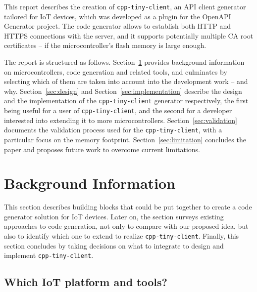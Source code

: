 \documentclass[manuscript,screen]{acmart}
\begin{document}
This report describes the creation of \texttt{cpp-tiny-client}, an API client generator tailored for IoT devices, which was developed as a plugin for the OpenAPI Generator project\cite{OpenAPIGenerator}. The code generator allows to establish both HTTP and HTTPS connections with the server, and it supports potentially multiple CA root certificates -- if the microcontroller's flash memory is large enough. 

The report is structured as follows. Section~\ref{sec:background} provides background information on microcontrollers, code generation and related tools, and culminates by selecting which of them are taken into account into the development work -- and why. Section~\ref{sec:design} and Section~\ref{sec:implementation} describe the design and the implementation of the \texttt{cpp-tiny-client} generator respectively, the first being useful for a user of \texttt{cpp-tiny-client}, and the second for a developer interested into extending it to more microcontrollers. Section~\ref{sec:validation} documents the validation process used for the \texttt{cpp-tiny-client}, with a particular focus on the memory footprint. Section~\ref{sec:limitation} concludes the paper and proposes future work to overcome current limitations. 



\section{Background Information}\label{sec:background}

This section describes building blocks that could be put together to create a code generator solution for IoT devices. 
Later on, the section surveys existing approaches to code generation, not only to compare with our proposed idea, but also to identify which one to extend to realize \texttt{cpp-tiny-client}. 
Finally, this section concludes by taking decisions on what to integrate to design and implement \texttt{cpp-tiny-client}. 









\subsection{Which IoT platform and tools?}\label{app:platform}
\end{document}

